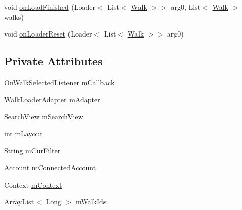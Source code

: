 \begin{DoxyCompactItemize}
\item 
void \hyperlink{classuk_1_1ac_1_1swan_1_1digitaltrails_1_1fragments_1_1_search_list_fragment_a547f9c40a40ae499759f22d979bdfc54}{on\+Load\+Finished} (Loader$<$ List$<$ \hyperlink{classuk_1_1ac_1_1swan_1_1digitaltrails_1_1components_1_1_walk}{Walk} $>$$>$ arg0, List$<$ \hyperlink{classuk_1_1ac_1_1swan_1_1digitaltrails_1_1components_1_1_walk}{Walk} $>$ walks)
\item 
void \hyperlink{classuk_1_1ac_1_1swan_1_1digitaltrails_1_1fragments_1_1_search_list_fragment_a658b4fc2640180401f37203d425e6550}{on\+Loader\+Reset} (Loader$<$ List$<$ \hyperlink{classuk_1_1ac_1_1swan_1_1digitaltrails_1_1components_1_1_walk}{Walk} $>$$>$ arg0)
\end{DoxyCompactItemize}
\subsection*{Private Attributes}
\begin{DoxyCompactItemize}
\item 
\hyperlink{interfaceuk_1_1ac_1_1swan_1_1digitaltrails_1_1fragments_1_1_search_list_fragment_1_1_on_walk_selected_listener}{On\+Walk\+Selected\+Listener} \hyperlink{classuk_1_1ac_1_1swan_1_1digitaltrails_1_1fragments_1_1_search_list_fragment_a9183d49e6eca9c91b1d7badc98fd378e}{m\+Callback}
\item 
\hyperlink{classuk_1_1ac_1_1swan_1_1digitaltrails_1_1sync_1_1_walk_loader_adapter}{Walk\+Loader\+Adapter} \hyperlink{classuk_1_1ac_1_1swan_1_1digitaltrails_1_1fragments_1_1_search_list_fragment_ab6c14396713429e5f3dbb458157703b2}{m\+Adapter}
\item 
Search\+View \hyperlink{classuk_1_1ac_1_1swan_1_1digitaltrails_1_1fragments_1_1_search_list_fragment_abbd29caf686461a33977d73670656629}{m\+Search\+View}
\item 
int \hyperlink{classuk_1_1ac_1_1swan_1_1digitaltrails_1_1fragments_1_1_search_list_fragment_a9c4f525036d95c59d348012f57a71f9b}{m\+Layout}
\item 
String \hyperlink{classuk_1_1ac_1_1swan_1_1digitaltrails_1_1fragments_1_1_search_list_fragment_aa5d3ea5abb39571b401131763a3819d3}{m\+Cur\+Filter}
\item 
Account \hyperlink{classuk_1_1ac_1_1swan_1_1digitaltrails_1_1fragments_1_1_search_list_fragment_a63a6d344a9905dbd51216fa0cfc5bc3d}{m\+Connected\+Account}
\item 
Context \hyperlink{classuk_1_1ac_1_1swan_1_1digitaltrails_1_1fragments_1_1_search_list_fragment_a882f5870b0f87062336e5c1db07dd210}{m\+Context}
\item 
Array\+List$<$ Long $>$ \hyperlink{classuk_1_1ac_1_1swan_1_1digitaltrails_1_1fragments_1_1_search_list_fragment_aae987d2b5032758e78eeee5b5205f20a}{m\+Walk\+Ids}
\end{DoxyCompactItemize}
